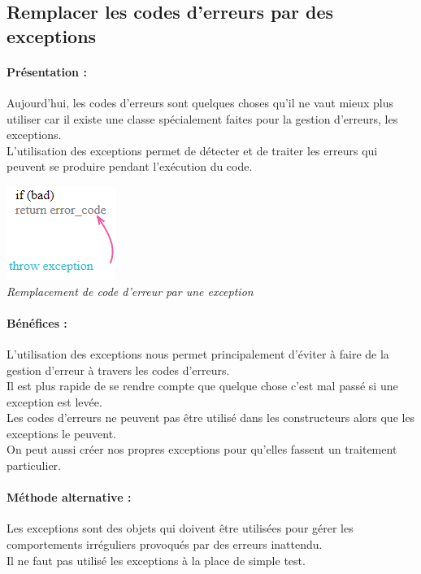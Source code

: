 \documentclass[a4paper,twoside,12pt,openright]{report}
\begin{document}
\subsection{Remplacer les codes d'erreurs par des exceptions}
\paragraph{Présentation :}
Aujourd'hui, les codes d'erreurs sont quelques choses  qu'il ne vaut mieux plus utiliser car il existe une classe spécialement faites pour la gestion d'erreurs, les exceptions.\\
L'utilisation des exceptions permet de détecter et de traiter les erreurs qui peuvent se produire pendant l'exécution du code.\\

\begin{center}
\includegraphics[scale=1]{Image/ThrowException.png}\\
\itshape{Remplacement de code d'erreur par une exception \cite{ref8}}
\end{center}

\paragraph{Bénéfices :}
L'utilisation des exceptions nous permet principalement d'éviter à faire de la gestion d'erreur à travers les codes d'erreurs.\\
Il est plus rapide de se rendre compte que quelque chose c'est mal passé si une exception est levée.\\
Les codes d'erreurs ne peuvent pas être utilisé dans les constructeurs alors que les exceptions le peuvent.\\
On peut aussi créer nos propres exceptions pour qu'elles fassent un traitement particulier.\\

\paragraph{Méthode alternative :}
Les exceptions sont des objets qui doivent être utilisées pour gérer les comportements irréguliers provoqués par des erreurs inattendu.\\
Il ne faut pas utilisé les exceptions à la place de simple test.\\
\end{document}
